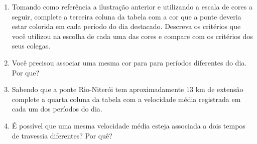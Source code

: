 \documentclass[10 pt,usenames,dvipsnames, oneside]{article}
\begin{document}
\begin{enumerate}
\item {} 
Tomando como referência a ilustração anterior e utilizando a escala de cores a seguir, complete a terceira coluna da tabela com a cor que a ponte deveria estar colorida em cada período do dia destacado. Descreva os critérios que você utilizou na escolha de cada uma das cores e compare com os critérios dos seus colegas.
\begin{center}\end{center}
\item {} 
Você precisou associar uma mesma cor para para períodos diferentes do dia. Por que?

\item {} 
Sabendo que a ponte Rio-Niterói tem aproximadamente \(13\) km de extensão complete a quarta coluna da tabela com a velocidade média registrada em cada um dos períodos do dia.

\item {} 
É possível que uma mesma velocidade média esteja associada a dois tempos de travessia diferentes? Por quê?
\end{enumerate}
\end{document}
